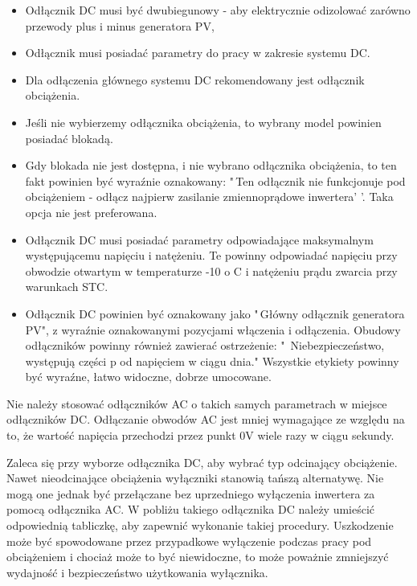 \documentclass[12pt,a4paper]{article}
\begin{document}
\begin{itemize}
\item Odłącznik DC musi być dwubiegunowy - aby elektrycznie odizolować 
zarówno przewody plus i minus generatora PV, 
\item Odłącznik musi posiadać parametry do pracy w zakresie systemu DC. 
\item Dla odłączenia głównego systemu DC rekomendowany jest odłącznik 
obciążenia. 
\item Jeśli nie wybierzemy odłącznika obciążenia, to wybrany model 
powinien posiadać blokadą. 
\item Gdy blokada nie jest dostępna, i nie wybrano odłącznika 
obciążenia, to ten fakt powinien być wyraźnie oznakowany: "\,Ten 
odłącznik nie funkcjonuje pod obciążeniem - odłącz najpierw zasilanie 
zmiennoprądowe inwertera' '. Taka opcja nie jest preferowana. 
\item Odłącznik DC musi posiadać parametry odpowiadające maksymalnym 
występującemu napięciu i natężeniu. Te powinny odpowiadać napięciu przy 
obwodzie otwartym w temperaturze -10 o C i natężeniu prądu zwarcia przy 
warunkach STC. 
\item Odłącznik DC powinien być oznakowany jako "\,Główny odłącznik 
generatora PV", z wyraźnie oznakowanymi pozycjami włączenia i 
odłączenia. Obudowy odłączników powinny również zawierać ostrzeżenie: 
"\, Niebezpieczeństwo, występują części p od napięciem w ciągu dnia." 
Wszystkie etykiety powinny być wyraźne, łatwo widoczne, dobrze 
umocowane. 
\end{itemize}
 

Nie należy stosować odłączników AC o takich samych parametrach w miejsce 
odłączników DC. Odłączanie obwodów AC jest mniej wymagające ze względu 
na to, że wartość napięcia przechodzi przez punkt 0V wiele razy w ciągu 
sekundy. 

Zaleca się przy wyborze odłącznika DC, aby wybrać typ odcinający 
obciążenie. Nawet nieodcinające obciążenia wyłączniki stanowią tańszą 
alternatywę. Nie mogą one jednak być przełączane bez uprzedniego 
wyłączenia inwertera za pomocą odłącznika AC. W pobliżu takiego 
odłącznika DC należy umieścić odpowiednią tabliczkę, aby zapewnić 
wykonanie takiej procedury. Uszkodzenie może być spowodowane przez 
przypadkowe wyłączenie podczas pracy pod obciążeniem i chociaż może to 
być niewidoczne, to może poważnie zmniejszyć wydajność i bezpieczeństwo 
użytkowania wyłącznika. 
\end{document}
